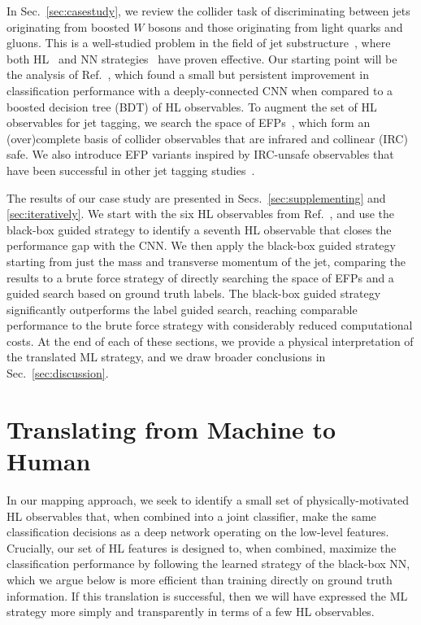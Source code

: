 \documentclass[aps,prd,twocolumn,superscriptaddress,preprintnumbers,nofootinbib,longbibliography,floatfix]{revtex4-1}
\newcommand{\rref}[1]{Ref.~\cite{#1}}
\newcommand{\Sec}[1]{Sec.~\ref{#1}}
\newcommand{\Secs}[2]{Secs.~\ref{#1} and \ref{#2}}
\begin{document}
In \Sec{sec:casestudy}, we review the collider task of discriminating between jets originating from boosted $W$ bosons and those originating from light quarks and gluons. This is a well-studied problem in the field of jet substructure~\cite{Seymour:1991cb,Seymour:1993mx,Butterworth:2002tt,Butterworth:2007ke,Butterworth:2008iy,Abdesselam:2010pt,Altheimer:2012mn,Shelton:2013an,Altheimer:2013yza,Adams:2015hiv,Larkoski:2017jix,Asquith:2018igt,Marzani:2019hun}, where both HL~\cite{Cui:2010km,Thaler:2010tr,Thaler:2011gf,Larkoski:2013eya,Aad:2014haa,Larkoski:2014gra} and NN strategies~\cite{deOliveira:2015xxd,Almeida:2015jua,Baldi:2016fql} have proven effective. Our starting point will be the analysis of \rref{Baldi:2016fql}, which found a small but persistent improvement in classification performance with a deeply-connected CNN when compared to a boosted decision tree (BDT) of HL observables. To augment the set of HL observables for jet tagging, we search the space of EFPs~\cite{Komiske:2017aww}, which form an (over)complete basis of collider observables that are infrared and collinear (IRC) safe. We also introduce EFP variants inspired by IRC-unsafe observables that have been successful in other jet tagging studies~\cite{Pandolfi:2012ima,Chatrchyan:2012sn,Larkoski:2014pca,Gras:2017jty}.

The results of our case study are presented in \Secs{sec:supplementing}{sec:iteratively}. We start with the six HL observables from \rref{Baldi:2016fql}, and use the black-box guided strategy to identify a seventh HL observable that closes the performance gap with the CNN. We then apply the black-box guided strategy starting from just the mass and transverse momentum of the jet, comparing the results to a brute force strategy of directly searching the space of EFPs and a guided search based on ground truth labels. The black-box guided strategy significantly outperforms the label guided search, reaching comparable performance to the brute force strategy with considerably reduced computational costs. At the end of each of these sections, we provide a physical interpretation of the translated ML strategy, and we draw broader conclusions in \Sec{sec:discussion}.

\section{Translating from Machine to Human}
\label{sec:strategy}
In our mapping approach, we seek to identify a small set of physically-motivated HL observables that, when combined into a joint classifier, make the same classification decisions as a deep network operating on the low-level  features. Crucially, our set of  HL features is designed to, when combined, maximize the classification performance by following the learned strategy of the black-box NN, which we argue below is more efficient than training directly on ground truth information. If this translation is successful, then we will have expressed the ML strategy more simply and transparently in terms of a few HL observables.
\end{document}
